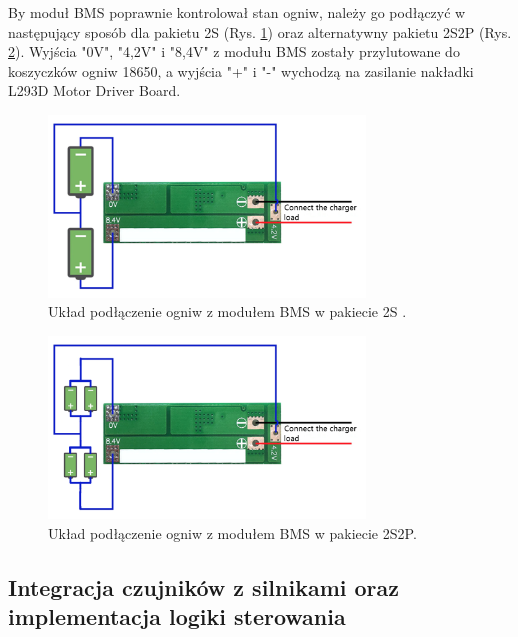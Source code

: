 \documentclass{report}
\begin{document}
By moduł BMS poprawnie kontrolował stan ogniw, należy go podłączyć w następujący sposób dla pakietu 2S (Rys. \ref{fig:BMS-2S-schematic}) oraz alternatywny pakietu 2S2P (Rys. \ref{fig:BMS-2S2P-schematic}). Wyjścia "0V", "4,2V" i "8,4V" z modułu BMS zostały przylutowane do koszyczków ogniw 18650, a wyjścia "+" i "-" wychodzą na zasilanie nakładki L293D Motor Driver Board.

\begin{figure}[H]
    \centering
    \includegraphics[width=0.75\textwidth]{src/cells_charts/BMS 2S schematic.png}
    \caption{Układ podłączenie ogniw z modułem BMS w pakiecie 2S \cite{BMSSchematic}.}
    \label{fig:BMS-2S-schematic}
\end{figure}

\begin{figure}[H]
    \centering
    \includegraphics[width=0.75\textwidth]{src/cells_charts/BMS 2S2P schematic.png}
    \caption{Układ podłączenie ogniw z modułem BMS w pakiecie 2S2P.}
    \label{fig:BMS-2S2P-schematic}
\end{figure}

\newpage
\subsection{\Large Integracja czujników z silnikami oraz implementacja logiki sterowania}
%
%
\end{document}
